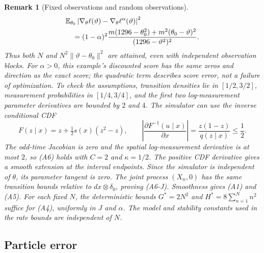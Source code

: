 \documentclass[11pt]{article}
\newtheorem{remark}{Remark}%
\theoremstyle{thmstylethree}%
\begin{document}
\begin{remark}[Fixed observations and random observations]
{\begin{align}
&\mathbb{E}_{\theta_0}\left|
\nabla_\theta\ell(\vartheta)-\nabla_\theta\ell^\alpha(\vartheta)
\right|^2\notag\\*
&\quad=(1-\alpha)^2
\frac{m(1296-\theta_0^2)+m^2(\theta_0-\vartheta)^2}
     {(1296-\vartheta^2)^2}.
\label{eq:continuous-offtruth-sharpness}
\end{align}
Thus both $N$ and $N^2\|\vartheta-\theta_0\|^2$ are attained, even
with independent observation blocks. For $\alpha>0$, this example's
discounted score has the same zeros and direction as the exact score;
the quadratic term describes score error, not a failure of optimization.
\endgraf
To check the assumptions, transition densities lie in $[1/2,3/2]$,
measurement probabilities in $[1/4,3/4]$, and the first two log-measurement
parameter derivatives are bounded by $2$ and $4$. The simulator can
use the inverse conditional CDF
\[
F(z\mid x)=z+\tfrac12s(x)(z^2-z),\qquad
\left|\frac{\partial F^{-1}(u\mid x)}{\partial x}\right|
=\frac{z(1-z)}{q(z\mid x)}\leq\frac12.
\]
The odd-time Jacobian is zero and the spatial log-measurement derivative
is at most $2$, so (A6) holds with $C=2$ and $\kappa=1/2$.
The positive CDF derivative gives a smooth extension at the interval
endpoints. Since the simulator is independent of $\theta$, its parameter
tangent is zero. The joint process $(X_n,0)$ has the same transition
bounds relative to $dx\otimes\delta_0$, proving (A6-J).
Smoothness gives (A1) and (A5). For each fixed $N$, the deterministic
bounds $G^*=2N^2$ and $H^*=8\sum_{n=1}^N n^2$ suffice for (A4), uniformly
in $J$ and $\alpha$. The model and stability constants used in the rate
bounds are independent of $N$.}
\end{remark}

\subsection{Particle error}
\end{document}
